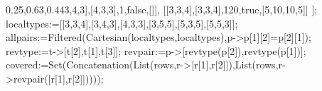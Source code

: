 \documentclass[
  11pt,
  a4paper,
]{article}
\newenvironment{Shaded}{}{}
\newcommand{\BuiltInTok}[1]{\textcolor[rgb]{0.00,0.50,0.00}{#1}}
\newcommand{\ConstantTok}[1]{\textcolor[rgb]{0.53,0.00,0.00}{#1}}
\newcommand{\FloatTok}[1]{\textcolor[rgb]{0.25,0.63,0.44}{#1}}
\newcommand{\NormalTok}[1]{#1}
\newcommand{\OperatorTok}[1]{\textcolor[rgb]{0.40,0.40,0.40}{#1}}
\newcommand{\VariableTok}[1]{\textcolor[rgb]{0.10,0.09,0.49}{#1}}
\begin{document}
\begin{Shaded}
\begin{Highlighting}[]
\NormalTok{ [[}\FloatTok{3}\OperatorTok{,}\FloatTok{4}\OperatorTok{,}\FloatTok{3}\NormalTok{]}\OperatorTok{,}\NormalTok{[}\FloatTok{4}\OperatorTok{,}\FloatTok{3}\OperatorTok{,}\FloatTok{3}\NormalTok{]}\OperatorTok{,}\FloatTok{1}\OperatorTok{,}\ConstantTok{false}\OperatorTok{,}\NormalTok{[]]}\OperatorTok{,}
\NormalTok{ [[}\FloatTok{3}\OperatorTok{,}\FloatTok{3}\OperatorTok{,}\FloatTok{4}\NormalTok{]}\OperatorTok{,}\NormalTok{[}\FloatTok{3}\OperatorTok{,}\FloatTok{3}\OperatorTok{,}\FloatTok{4}\NormalTok{]}\OperatorTok{,}\FloatTok{120}\OperatorTok{,}\ConstantTok{true}\OperatorTok{,}\NormalTok{[}\FloatTok{5}\OperatorTok{,}\FloatTok{10}\OperatorTok{,}\FloatTok{10}\OperatorTok{,}\FloatTok{5}\NormalTok{]] ]}\OperatorTok{;}
\VariableTok{localtypes}\OperatorTok{:=}\NormalTok{[[}\FloatTok{3}\OperatorTok{,}\FloatTok{3}\OperatorTok{,}\FloatTok{4}\NormalTok{]}\OperatorTok{,}\NormalTok{[}\FloatTok{3}\OperatorTok{,}\FloatTok{4}\OperatorTok{,}\FloatTok{3}\NormalTok{]}\OperatorTok{,}\NormalTok{[}\FloatTok{4}\OperatorTok{,}\FloatTok{3}\OperatorTok{,}\FloatTok{3}\NormalTok{]}\OperatorTok{,}\NormalTok{[}\FloatTok{3}\OperatorTok{,}\FloatTok{5}\OperatorTok{,}\FloatTok{5}\NormalTok{]}\OperatorTok{,}\NormalTok{[}\FloatTok{5}\OperatorTok{,}\FloatTok{3}\OperatorTok{,}\FloatTok{5}\NormalTok{]}\OperatorTok{,}\NormalTok{[}\FloatTok{5}\OperatorTok{,}\FloatTok{5}\OperatorTok{,}\FloatTok{3}\NormalTok{]]}\OperatorTok{;}
\VariableTok{allpairs}\OperatorTok{:=}\BuiltInTok{Filtered}\NormalTok{(}\BuiltInTok{Cartesian}\NormalTok{(}\VariableTok{localtypes}\OperatorTok{,}\VariableTok{localtypes}\NormalTok{)}\OperatorTok{,}\VariableTok{p}\OperatorTok{{-}\textgreater{}}\VariableTok{p}\NormalTok{[}\FloatTok{1}\NormalTok{][}\FloatTok{2}\NormalTok{]}\OperatorTok{=}\VariableTok{p}\NormalTok{[}\FloatTok{2}\NormalTok{][}\FloatTok{1}\NormalTok{])}\OperatorTok{;}
\VariableTok{revtype}\OperatorTok{:=}\VariableTok{t}\OperatorTok{{-}\textgreater{}}\NormalTok{[}\VariableTok{t}\NormalTok{[}\FloatTok{2}\NormalTok{]}\OperatorTok{,}\VariableTok{t}\NormalTok{[}\FloatTok{1}\NormalTok{]}\OperatorTok{,}\VariableTok{t}\NormalTok{[}\FloatTok{3}\NormalTok{]]}\OperatorTok{;}
\VariableTok{revpair}\OperatorTok{:=}\VariableTok{p}\OperatorTok{{-}\textgreater{}}\NormalTok{[}\VariableTok{revtype}\NormalTok{(}\VariableTok{p}\NormalTok{[}\FloatTok{2}\NormalTok{])}\OperatorTok{,}\VariableTok{revtype}\NormalTok{(}\VariableTok{p}\NormalTok{[}\FloatTok{1}\NormalTok{])]}\OperatorTok{;}
\VariableTok{covered}\OperatorTok{:=}\BuiltInTok{Set}\NormalTok{(}\BuiltInTok{Concatenation}\NormalTok{(}\BuiltInTok{List}\NormalTok{(}\VariableTok{rows}\OperatorTok{,}\VariableTok{r}\OperatorTok{{-}\textgreater{}}\NormalTok{[}\VariableTok{r}\NormalTok{[}\FloatTok{1}\NormalTok{]}\OperatorTok{,}\VariableTok{r}\NormalTok{[}\FloatTok{2}\NormalTok{]])}\OperatorTok{,}\BuiltInTok{List}\NormalTok{(}\VariableTok{rows}\OperatorTok{,}\VariableTok{r}\OperatorTok{{-}\textgreater{}}\VariableTok{revpair}\NormalTok{([}\VariableTok{r}\NormalTok{[}\FloatTok{1}\NormalTok{]}\OperatorTok{,}\VariableTok{r}\NormalTok{[}\FloatTok{2}\NormalTok{]]))))}\OperatorTok{;}

\end{Highlighting}
\end{Shaded}
\end{document}
